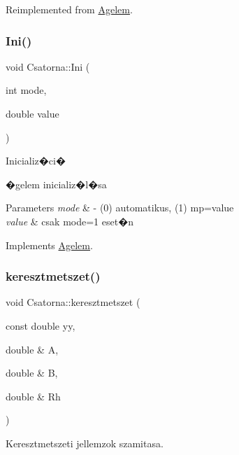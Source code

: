 Reimplemented from \hyperlink{class_agelem_a2e6c4688cdbdf17c6d3bde0c6c08ff49}{Agelem}.

\mbox{\label{class_csatorna_ab30adea649ae8708061e211dc450cb06}} 
\subsubsection{\texorpdfstring{Ini()}{Ini()}}
{\footnotesize\ttfamily void Csatorna\+::\+Ini (\begin{DoxyParamCaption}\item[{int}]{mode,  }\item[{double}]{value }\end{DoxyParamCaption})\hspace{0.3cm}{\ttfamily [virtual]}}



Inicializ�ci� 

�gelem inicializ�l�sa


\begin{DoxyParams}{Parameters}
{\em mode} & -\/ (0) automatikus, (1) mp=value \\
\hline
{\em value} & csak mode=1 eset�n \\
\hline
\end{DoxyParams}


Implements \hyperlink{class_agelem_a844171faf01143770bbd894b1a48e72f}{Agelem}.

\mbox{\label{class_csatorna_ab9528187fc3d40d210c85b72d7856f10}} 
\subsubsection{\texorpdfstring{keresztmetszet()}{keresztmetszet()}}
{\footnotesize\ttfamily void Csatorna\+::keresztmetszet (\begin{DoxyParamCaption}\item[{const double}]{yy,  }\item[{double \&}]{A,  }\item[{double \&}]{B,  }\item[{double \&}]{Rh }\end{DoxyParamCaption})}



Keresztmetszeti jellemzok szamitasa. 


